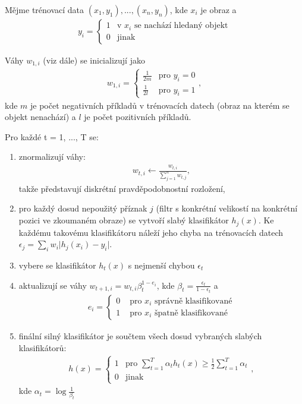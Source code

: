 	Mějme trénovací data $(x_1, y_1), ... ,(x_n, y_n)$, kde $x_i$ je obraz a 
	\begin{align}
	y_i = \begin{cases}
	1 & \text{v } x_i \text{ se nachází hledaný objekt} \\
	0 & \text{jinak}
	\end{cases}
	\end{align}  
	
	Váhy $w_{1,i}$ (viz dále)  se inicializují jako 
	\begin{align}
	w_{1,i} = \begin{cases}
	\frac{1}{2m} & \text{pro } y_i = 0\\
	\frac{1}{2l} & \text{pro } y_i = 1
	\end{cases},
	\end{align}
	kde $m$ je počet negativních příkladů v trénovacích datech (obraz na kterém se objekt nenachází) a $l$ je počet pozitivních příkladů.
	
	Pro každé t = 1, ..., T se:
	
	\begin{enumerate}
		\item znormalizují váhy:
		\begin{align}
			w_{t,i} \leftarrow \frac{w_{t,i}}{\sum_{j=1}^{n}w_{t,j}},
		\end{align}
		takže představují diskrétní pravděpodobnostní rozložení,
		\item pro každý dosud nepoužitý příznak $j$ (filtr s konkrétní velikostí na konkrétní pozici ve zkoumaném obraze) se vytvoří slabý klasifikátor $h_j(x)$. Ke každému takovému klasifikátoru náleží jeho chyba na trénovacích datech $\epsilon_j = \sum_{i} w_i \lvert h_j(x_i)-y_i \rvert$.
		\item vybere se klasifikátor $h_t(x)$ s nejmenší chybou $\epsilon_t$
		\item aktualizují se váhy $w_{t+1,i} = w_{t,i}\beta_t^{1-e_i}$, kde $\beta_t = \frac{\epsilon_t}{1 - \epsilon_t}$ a 
		\begin{align}
		e_i = \begin{cases}
		0 & \text{ pro } x_i \text{ správně klasifikované} \\
		1 & \text{ pro } x_i \text{ špatně klasifikované} 
		\end{cases}
		\end{align} 
		\item finální silný klasifikátor je součtem všech dosud vybraných slabých klasifikátorů:
		\begin{align}
		h(x) = \begin{cases}
				1 & \text{pro } \sum_{t=1}^{T} \alpha_t h_t(x) \geq \frac{1}{2} \sum_{t=1}^{T} \alpha_t \\
				0 & \text{jinak}
			   \end{cases},
		\end{align}
		kde $\alpha_t = \log \frac{1}{\beta_t}$
	\end{enumerate}
	
